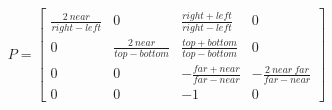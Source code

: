 \documentclass{article}
\begin{document}
$$
  P =
\left[ \begin{array}{cccc}
    \frac{2~near}{right-left}    & 0 & \frac{right+left}{right-left} & 0\\
    0 & \frac{2~near}{top-bottom} & \frac{top+bottom}{top-bottom} & 0\\
    0 & 0 & -\frac{far+near}{far-near} & -\frac{2~near~far}{far-near} \\
    0 & 0 & -1 & 0
  \end{array} \right]
$$
\end{document}
